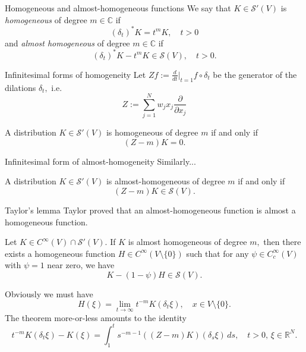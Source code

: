 \documentclass{beamer}
\numberwithin{equation}{section}
\theoremstyle{plain}
\theoremstyle{plain}
\theoremstyle{definition}
\theoremstyle{plain}
\theoremstyle{plain}
\theoremstyle{definition}
\newcommand{\Rl}{\mathbb{R}}
\newcommand{\Cplx}{\mathbb{C}}
\newcommand{\Sc}{\mathcal{S}}
\begin{document}
\begin{frame}{Homogeneous and almost-homogeneous functions}
    We say that $K\in \Sc'(V)$ is \emph{homogeneous} of degree $m\in \Cplx$ if
    \[
        (\delta_t)^*K = t^mK,\quad t > 0
    \]
    and \emph{almost homogeneous} of degree $m\in \Cplx$ if
    \[
        (\delta_t)^*K-t^mK\in \Sc(V),\quad t > 0.
    \]
\end{frame}

\begin{frame}{Infinitesimal forms of homogeneity}
    Let $Zf := \frac{d}{dt}|_{t=1}f\circ \delta_t$ be the generator of the dilations $\delta_t,$ i.e.
    \[
        Z := \sum_{j=1}^N w_jx_j\frac{\partial}{\partial x_j}
    \]
    \begin{theorem}
        A distribution $K\in \Sc'(V)$ is homogeneous of degree $m$ if and only if
        \[
            (Z-m)K=0.
        \]
    \end{theorem}
\end{frame}

\begin{frame}{Infinitesimal form of almost-homogeneity}
    Similarly...
    \begin{theorem}
        A distribution $K\in \Sc'(V)$ is almost-homogeneous of degree $m$ if and only if
        \[
            (Z-m)K \in \Sc(V).
        \]
    \end{theorem}
\end{frame}

\begin{frame}{Taylor's lemma}
    Taylor proved that an almost-homogeneous function is almost a homogeneous function.
    \begin{lemma}[Taylor(?), 1984]
        Let $K\in C^{\infty}(V)\cap \Sc'(V).$ If $K$ is almost homogeneous of degree $m,$ then there exists a homogeneous function $H\in C^{\infty}(V\setminus \{0\})$ such that for any $\psi\in C^\infty_c(V)$ with $\psi=1$ near zero, we have
        \[
            K-(1-\psi)H \in \Sc(V).
        \]
    \end{lemma}
    Obviously we must have
    \[
        H(\xi) = \lim_{t\to\infty} t^{-m}K(\delta_t\xi),\quad x \in V\setminus \{0\}.
    \]
    The theorem more-or-less amounts to the identity
    \[
        t^{-m}K(\delta_t \xi)-K(\xi) = \int_1^t s^{-m-1}((Z-m)K)(\delta_s \xi)\,ds,\quad t>0,\, \xi\in \Rl^N.
    \]
\end{frame}
\end{document}
